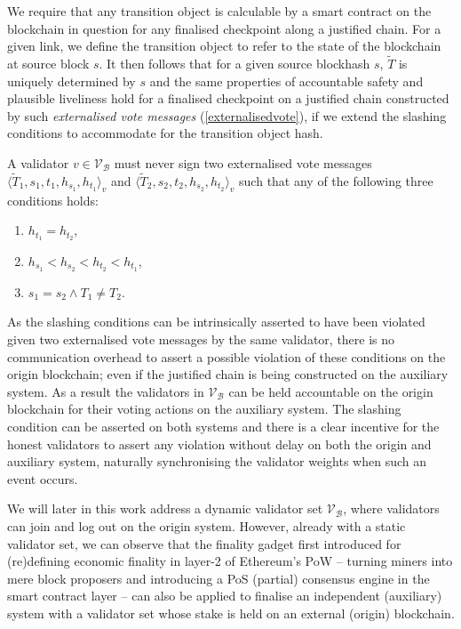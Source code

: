 \documentclass[12pt,a4paper]{article}
\begin{document}
We require that any transition object is calculable by a smart contract on the blockchain in question for any finalised checkpoint along a justified chain.
For a given link, we define the transition object to refer to the state of the blockchain at source block $s$. %
It then follows that for a given source blockhash $s$, $\tilde{T}$ is uniquely determined by $s$ and the same properties of accountable safety and plausible liveliness hold for a finalised checkpoint on a justified chain constructed by such \emph{externalised vote messages} (\ref{externalisedvote}), if we extend the slashing conditions to accommodate for the transition object hash.

A validator $v \in \mathcal{V}_\mathcal{B}$ must never sign two externalised vote messages $\langle \tilde{T}_1, s_1, t_1, h_{s_1}, h_{t_1}\rangle_v$ and $\langle \tilde{T}_2, s_2, t_2, h_{s_2}, h_{t_2}\rangle_v$ such that any of the following three conditions holds:
\begin{enumerate}
  \item $h_{t_1} = h_{t_2}$,
  \item $h_{s_1} < h_{s_2} < h_{t_2} < h_{t_1}$,
  \item $s_1 = s_2 \land T_1 \neq T_2$.
\end{enumerate}

As the slashing conditions can be intrinsically asserted to have been violated given two externalised vote messages by the same validator, there is no communication overhead to assert a possible violation of these conditions on the origin blockchain; even if the justified chain is being constructed on the auxiliary system.
As a result the validators in $\mathcal{V}_\mathcal{B}$ can be held accountable on the origin blockchain for their voting actions on the auxiliary system.
The slashing condition can be asserted on both systems and there is a clear incentive for the honest validators to assert any violation without delay on both the origin and auxiliary system, naturally synchronising the validator weights when such an event occurs.

We will later in this work address a dynamic validator set $\mathcal{V}_\mathcal{B}$, where validators can join and log out on the origin system.
However, already with a static validator set, we can observe that the finality gadget first introduced for (re)defining economic finality in layer-2 of Ethereum's PoW -- turning miners into mere block proposers and introducing a PoS (partial) consensus engine in the smart contract layer -- can also be applied to finalise an independent (auxiliary) system with a validator set whose stake is held on an external (origin) blockchain.
\end{document}
